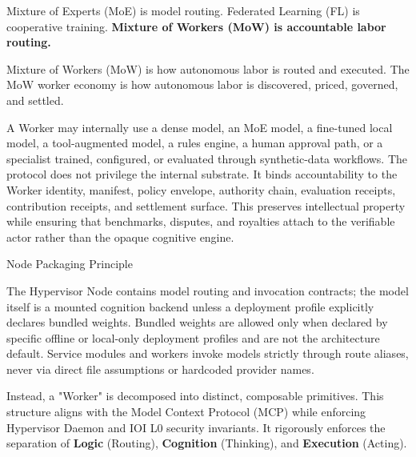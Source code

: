 \documentclass[
  11pt,
]{article}
\begin{document}
Mixture of Experts (MoE) is model routing. Federated Learning (FL) is
cooperative training. \textbf{Mixture of Workers (MoW) is accountable
labor routing.}

Mixture of Workers (MoW) is how autonomous labor is routed and executed.
The MoW worker economy is how autonomous labor is discovered, priced,
governed, and settled.

A Worker may internally use a dense model, an MoE model, a fine-tuned
local model, a tool-augmented model, a rules engine, a human approval
path, or a specialist trained, configured, or evaluated through
synthetic-data workflows. The protocol does not privilege the internal
substrate. It binds accountability to the Worker identity, manifest,
policy envelope, authority chain, evaluation receipts, contribution
receipts, and settlement surface. This preserves intellectual property
while ensuring that benchmarks, disputes, and royalties attach to the
verifiable actor rather than the opaque cognitive engine.

Node Packaging Principle

The Hypervisor Node contains model routing and invocation contracts; the
model itself is a mounted cognition backend unless a deployment profile
explicitly declares bundled weights. Bundled weights are allowed only
when declared by specific offline or local-only deployment profiles and
are not the architecture default. Service modules and workers invoke
models strictly through route aliases, never via direct file assumptions
or hardcoded provider names.

Instead, a "Worker" is decomposed into distinct, composable primitives.
This structure aligns with the Model Context Protocol (MCP) while
enforcing Hypervisor Daemon and IOI L0 security invariants.
It rigorously enforces the separation of \textbf{Logic} (Routing),
\textbf{Cognition} (Thinking), and \textbf{Execution} (Acting).


\begin{center}
\end{center}
\end{document}
